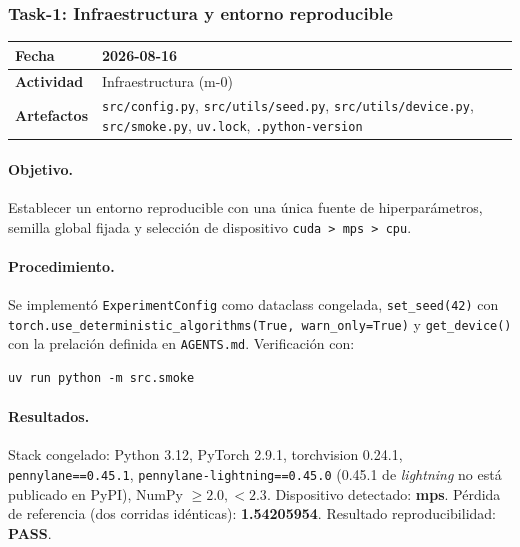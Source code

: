 
\subsubsection{Task-1: Infraestructura y entorno reproducible}
\label{hallazgo:task-1}
\begin{tabularx}{\textwidth}{|l|X|}\hline
\textbf{Fecha} & 2026-08-16 \\\hline
\textbf{Actividad} & Infraestructura (m-0) \\\hline
\textbf{Artefactos} & \texttt{src/config.py}, \texttt{src/utils/seed.py}, \texttt{src/utils/device.py}, \texttt{src/smoke.py}, \texttt{uv.lock}, \texttt{.python-version} \\\hline
\end{tabularx}

\paragraph{Objetivo.}
Establecer un entorno reproducible con una única fuente de hiperparámetros,
semilla global fijada y selección de dispositivo \texttt{cuda > mps > cpu}.

\paragraph{Procedimiento.}
Se implementó \texttt{ExperimentConfig} como dataclass congelada, \texttt{set\_seed(42)}
con \texttt{torch.use\_deterministic\_algorithms(True, warn\_only=True)} y
\texttt{get\_device()} con la prelación definida en \texttt{AGENTS.md}.
Verificación con:
\begin{verbatim}
uv run python -m src.smoke
\end{verbatim}

\paragraph{Resultados.}
Stack congelado: Python 3.12, PyTorch 2.9.1, torchvision 0.24.1,
\texttt{pennylane==0.45.1}, \texttt{pennylane-lightning==0.45.0} (0.45.1 de
\textit{lightning} no está publicado en PyPI), NumPy $\geq 2.0,< 2.3$.
Dispositivo detectado: \textbf{mps}.
Pérdida de referencia (dos corridas idénticas): \textbf{1.54205954}.
Resultado reproducibilidad: \textbf{PASS}.

